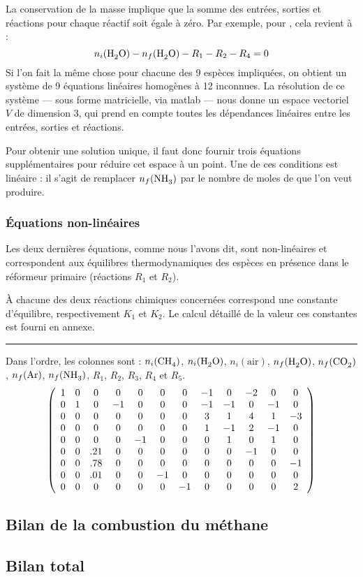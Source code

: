 La conservation de la masse implique que la somme des entrées, sorties et réactions pour chaque réactif soit égale à zéro. Par exemple, pour , cela revient à :
\[
  n_i(\ce{H2O}) - n_f(\ce{H2O}) - R_1 - R_2 - R_4 = 0
\]
Si l'on fait la même chose pour chacune des 9 espèces impliquées, on obtient un système de 9 équations linéaires homogènes à 12 inconnues. La résolution de ce système --- sous forme matricielle, via matlab --- nous donne un espace vectoriel $V$ de dimension 3, qui prend en compte toutes les dépendances linéaires entre les entrées, sorties et réactions.

Pour obtenir une solution unique, il faut donc fournir trois équations supplémentaires pour réduire cet espace à un point. Une de ces conditions est linéaire : il s'agit de remplacer $n_f(\ce{NH3})$ par le nombre de moles de  que l'on veut produire.

\subsubsection{Équations non-linéaires}

Les deux dernières équations, comme nous l'avons dit, sont non-linéaires et correspondent aux équilibres thermodynamiques des espèces en présence dans le réformeur primaire (réactions $R_1$ et $R_2$).

À chacune des deux réactions chimiques concernées correspond une constante d'équilibre, respectivement $K_1$ et $K_2$. Le calcul détaillé de la valeur ces constantes est fourni en annexe.



\hrule

Dans l'ordre, les colonnes sont : $n_i(\ce{CH4})$, $n_i(\ce{H2O})$, $n_i(\text{air})$, $n_f(\ce{H2O})$, $n_f(\ce{CO2})$, $n_f(\ce{Ar})$, $n_f(\ce{NH3})$, $R_1$, $R_2$, $R_3$, $R_4$ et $R_5$.
\[
\left(
\begin{array}{*{12}c}
  1 & 0 & 0 & 0 & 0 & 0 & 0 & -1 & 0 & -2 & 0 & 0 \\
  0 & 1 & 0 & -1 & 0 & 0 & 0 & -1 & -1 & 0 & -1 & 0 \\
  0 & 0 & 0 & 0 & 0 & 0 & 0 & 3 & 1 & 4 & 1 & -3 \\
  0 & 0 & 0 & 0 & 0 & 0 & 0 & 1 & -1 & 2 & -1 & 0 \\
  0 & 0 & 0 & 0 & -1 & 0 & 0 & 0 & 1 & 0 & 1 & 0 \\
  0 & 0 & .21 & 0 & 0 & 0 & 0 & 0 & 0 & -1 & 0 & 0 \\
  0 & 0 & .78 & 0 & 0 & 0 & 0 & 0 & 0 & 0 & 0 & -1 \\
  0 & 0 & .01 & 0 & 0 & -1 & 0 & 0 & 0 & 0 & 0 & 0 \\
  0 & 0 & 0 & 0 & 0 & 0 & -1 & 0 & 0 & 0 & 0 & 2
\end{array}
\right)
\]


\subsection{Bilan de la combustion du méthane}



\subsection{Bilan total}



